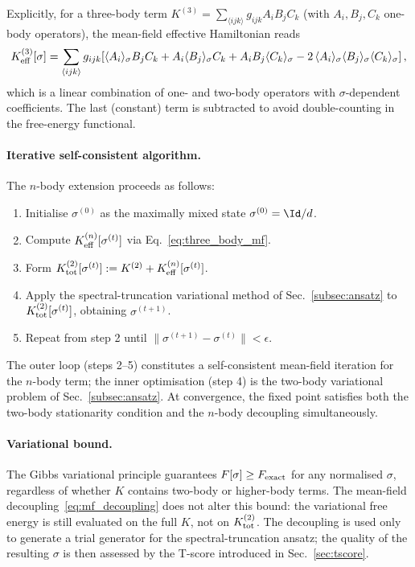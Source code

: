 Explicitly, for a three-body term $K^{(3)} = \sum_{\langle ijk\rangle} g_{ijk}
A_i B_j C_k$ (with $A_i, B_j, C_k$ one-body operators), the mean-field
effective Hamiltonian reads
\begin{equation}
  K^{(3)}_{\rm eff}[\sigma]
  = \sum_{\langle ijk\rangle} g_{ijk}\!\left[
      \langle A_i\rangle_\sigma B_j C_k
    + A_i \langle B_j\rangle_\sigma C_k
    + A_i B_j \langle C_k\rangle_\sigma
    - 2\,\langle A_i\rangle_\sigma\langle B_j\rangle_\sigma\langle C_k\rangle_\sigma
  \right],
  \label{eq:three_body_mf}
\end{equation}
which is a linear combination of one- and two-body operators with
$\sigma$-dependent coefficients.
The last (constant) term is subtracted to avoid double-counting in the
free-energy functional.

\paragraph{Iterative self-consistent algorithm.}
The $n$-body extension proceeds as follows:
\begin{enumerate}
  \item Initialise $\sigma^{(0)}$ as the maximally mixed state
        $\sigma^{(0)} = \Id/d$.
  \item Compute $K^{(n)}_{\rm eff}[\sigma^{(t)}]$ via
        Eq.~\eqref{eq:three_body_mf}.
  \item Form $K^{(2)}_{\rm tot}[\sigma^{(t)}] := K^{(2)} + K^{(n)}_{\rm eff}[\sigma^{(t)}]$.
  \item Apply the spectral-truncation variational method of
        Sec.~\ref{subsec:ansatz} to $K^{(2)}_{\rm tot}[\sigma^{(t)}]$,
        obtaining $\sigma^{(t+1)}$.
  \item Repeat from step 2 until $\|\sigma^{(t+1)} - \sigma^{(t)}\| < \epsilon$.
\end{enumerate}
The outer loop (steps 2--5) constitutes a self-consistent mean-field iteration
for the $n$-body term; the inner optimisation (step 4) is the two-body
variational problem of Sec.~\ref{subsec:ansatz}.
At convergence, the fixed point satisfies both the two-body stationarity
condition and the $n$-body decoupling simultaneously.

\paragraph{Variational bound.}
The Gibbs variational principle guarantees $F[\sigma] \ge F_{\rm exact}$ for
any normalised $\sigma$, regardless of whether $K$ contains two-body or
higher-body terms.
The mean-field decoupling~\eqref{eq:mf_decoupling} does not alter this bound:
the variational free energy is still evaluated on the full $K$, not on
$K^{(2)}_{\rm tot}$.
The decoupling is used only to generate a trial generator for the
spectral-truncation ansatz; the quality of the resulting $\sigma$ is then
assessed by the T-score introduced in Sec.~\ref{sec:tscore}.


